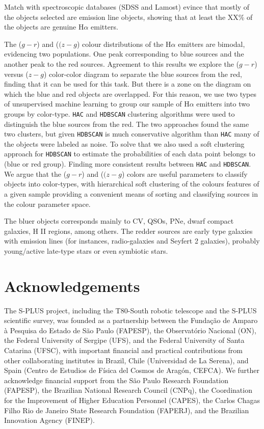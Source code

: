 \documentclass[fleqn,usenatbib]{mnras}
\begin{document}
Match with spectroscopic databases (SDSS and Lamost) evince that mostly of the objects 
selected are emission line objects, showing  that at least the XX\% of the objects are 
genuine H$\alpha$ emitters. 

The ($g - r$) and ($(z - g$) colour distributions of the H{$\alpha$} emitters are bimodal, 
evidencing two populations. One peak corresponding to blue sources and the another peak to the 
red sources. Agreement to this results we explore the ($g - r$) versus ($z - g$) color-color diagram 
to separate the blue sources from the red, finding that it can be used for this task. But there is a zone 
on the diagram on which the blue and red objects are overlapped. 
For this reason, we use two types of unsupervised machine learning to group our sample of H{$\alpha$} 
emitters into two groups by color-type. \texttt{HAC} and \texttt{HDBSCAN} clustering algorithms were 
used to distinguish the blue sources from the red. The two approaches found the same two clusters, 
but given \texttt{HDBSCAN} is much conservative algorithm than  \texttt{HAC}
many of the objects were labeled as noise. To solve that we also used a soft clustering approach 
for \texttt{HDBSCAN} to estimate the probabilities of each data point belongs to (blue or red group). 
Finding more consistent results between \texttt{HAC} and \texttt{HDBSCAN}. We argue that
the ($g - r$) and ($(z - g$) colors are useful parameters to classify objects into color-types,
with hierarchical soft clustering of the colours features of a given sample providing a 
convenient means of sorting and classifying sources in the colour parameter space. 

The bluer objects corresponds mainly to  CV, QSOs, PNe, dwarf compact galaxies, H II regions, 
among others. The redder sources are early type galaxies with emission lines (for instances, 
radio-galaxies and Seyfert 2 galaxies), probably young/active late-type stars or 
even symbiotic stars. 

\section*{Acknowledgements}

The S-PLUS project, including the T80-South robotic telescope and
the S-PLUS scientific survey, was founded as a partnership between the
Fundação de Amparo à Pesquisa do Estado de S\~{a}o Paulo
(FAPESP), the Observatório Nacional (ON), the Federal University of
Sergipe (UFS), and the Federal University of Santa Catarina
(UFSC), with important financial and practical contributions from
other collaborating institutes in Brazil, Chile (Universidad de La
Serena), and Spain (Centro de Estudios de Física del Cosmos de
Aragón, CEFCA). We further acknowledge financial support from
the São Paulo Research Foundation (FAPESP), the Brazilian National
Research Council (CNPq), the Coordination for the Improvement of
Higher Education Personnel (CAPES), the Carlos Chagas Filho Rio
de Janeiro State Research Foundation (FAPERJ), and the Brazilian
Innovation Agency (FINEP).
\end{document}
